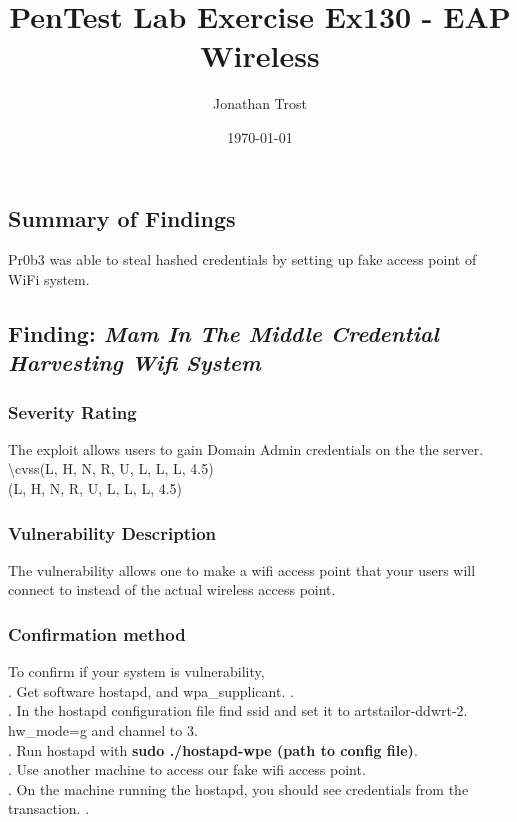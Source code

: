 \documentclass[notitlepage]{article}
\begin{document}
	
	
	\title{PenTest Lab Exercise Ex130 - EAP Wireless}
	\author{Jonathan Trost}
	\date{\isodate\today}
	
	\maketitle
	
	\tableofcontents
	
	\newpage
	
	\subsection{Summary of Findings}
	\indent Pr0b3 was able to steal hashed credentials by setting up fake access point of WiFi system. 
	
	\subsection{Finding: \emph{Mam In The Middle Credential Harvesting Wifi System}}
	
	\subsubsection{Severity Rating}
	\indent The exploit allows users to gain Domain Admin credentials on the the server. 
	\textbackslash cvss(L, H, N, R, U, L, L, L, 4.5)\\
	\cvss(L, H, N, R, U, L, L, L, 4.5) \\
	
	\subsubsection{Vulnerability Description}
	\indent The vulnerability allows one to make a wifi access point that your users will connect to instead of the actual wireless access point.  \\
	
	\subsubsection{Confirmation method}
	To confirm if your system is vulnerability, \\
	. Get software hostapd, and wpa\_supplicant.  .\\
	. In the hostapd configuration file find ssid and set it to artstailor-ddwrt-2. hw\_mode=g and channel to 3.\\
	. Run hostapd with \textbf{sudo ./hostapd-wpe (path to config file)}.\\
	. Use another machine to access our fake wifi access point. \\
	. On the machine running the hostapd, you should see credentials from the transaction. . \\
		
\end{document}
